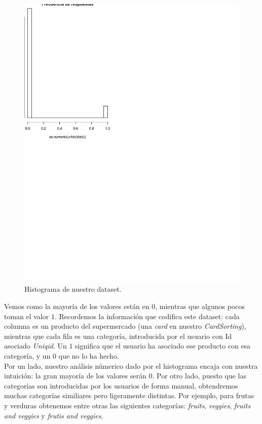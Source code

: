 \documentclass[a4paper]{article}
\begin{document}
\begin{figure}[H]
	\includegraphics[scale=.6]{figures/hist}
	\centering
	\caption{Histograma de nuestro dataset.}
\end{figure}

Vemos como la mayoría de los valores están en $0$, mientras que algunos pocos toman el valor $1$. Recordemos la información que codifica este dataset: cada columna es un producto del supermercado (una \emph{card} en nuestro \emph{CardSorting}), mientras que cada fila es una categoría, introducida por el usuario con Id asociado \emph{Uniqid}. Un $1$ significa que el usuario ha asociado ese producto con esa categoría, y un $0$ que no lo ha hecho. \\

Por un lado, nuestro análisis númerico dado por el histograma encaja con nuestra intuición: la gran mayoría de los valores serán $0$. Por otro lado, puesto que las categorías son introducidas por los usuarios de forma manual, obtendremos muchas categorías similiares pero ligeramente distintas. Por ejemplo, para frutas y verduras obtenemos entre otras las siguientes categorías: \emph{fruits}, \emph{veggies}, \emph{fruits and veggies} y \emph{frutis and veggies}.
\end{document}
